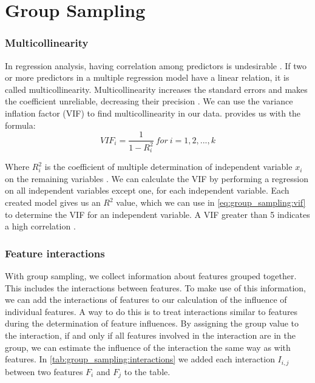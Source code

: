 \documentclass[../thesis.tex]{subfiles}
\begin{document}
\chapter{Group Sampling}\label{chapter:group_sampling}











\subsection{Multicollinearity}

In regression analysis, having correlation among predictors is undesirable \cite{daoud2017multicollinearity}.
If two or more predictors in a multiple regression model have a linear relation, it is called multicollinearity.
Multicollinearity increases the standard errors and makes the coefficient unreliable, decreasing their precision \cite{alin2010multicollinearity}.
We can use the variance inflation factor (VIF) to find multicollinearity in our data.
\citet{alin2010multicollinearity} provides us with the formula:
\begin{equation}
    VIF_i = \frac{1}{1-R^{2}_i}\ for\ i=1,2,...,k
\end{equation}\label{eq:group_sampling:vif}

Where $ R^{2}_i $ is the coefficient of multiple determination of independent variable $x_i$ on the remaining variables \cite{alin2010multicollinearity}.
We can calculate the VIF by performing a regression on all independent variables except one, for each independent variable. 
Each created model gives us an $R^{2}$ value, which we can use in \autoref{eq:group_sampling:vif} to determine the VIF for
an independent variable. A VIF greater than 5 indicates a high correlation \cite{daoud2017multicollinearity}.



\subsection{Feature interactions}\label{sec:group_sampling:interactions}

With group sampling, we collect information about features grouped together.
This includes the interactions between features. To make use of this information,
we can add the interactions of features to our calculation of the influence of individual features.
A way to do this is to treat interactions similar to features during the determination
of feature influences. By assigning the group value to the interaction, if and only if all features
involved in the interaction are in the group, we can estimate the influence of the interaction 
the same way as with features. 
In \autoref{tab:group_sampling:interactions} we added each interaction $I_{i,j}$ between two features $F_i$ and $F_j$ to
the table.
\end{document}
